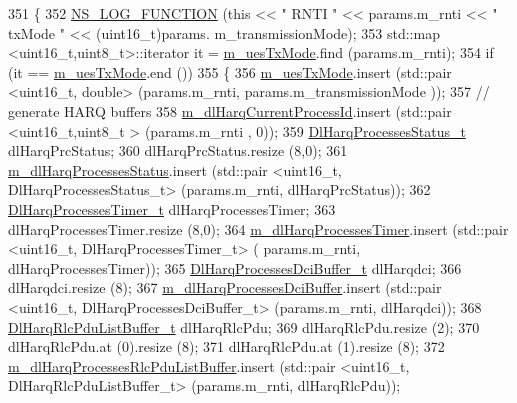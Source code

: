 \begin{DoxyCode}
351 \{
352   \hyperlink{log-macros-disabled_8h_a90b90d5bad1f39cb1b64923ea94c0761}{NS\_LOG\_FUNCTION} (\textcolor{keyword}{this} << \textcolor{stringliteral}{" RNTI "} << params.m\_rnti << \textcolor{stringliteral}{" txMode "} << (uint16\_t)params.
      m\_transmissionMode);
353   std::map <uint16\_t,uint8\_t>::iterator it = \hyperlink{classns3_1_1TdTbfqFfMacScheduler_a81895414769458c1204040d901d7bba7}{m\_uesTxMode}.find (params.m\_rnti);
354   \textcolor{keywordflow}{if} (it == \hyperlink{classns3_1_1TdTbfqFfMacScheduler_a81895414769458c1204040d901d7bba7}{m\_uesTxMode}.end ())
355     \{
356       \hyperlink{classns3_1_1TdTbfqFfMacScheduler_a81895414769458c1204040d901d7bba7}{m\_uesTxMode}.insert (std::pair <uint16\_t, double> (params.m\_rnti, params.m\_transmissionMode
      ));
357       \textcolor{comment}{// generate HARQ buffers}
358       \hyperlink{classns3_1_1TdTbfqFfMacScheduler_ad1c507f0824369e326a2f4594a19f5e9}{m\_dlHarqCurrentProcessId}.insert (std::pair <uint16\_t,uint8\_t > (params.m\_rnti
      , 0));
359       \hyperlink{namespacens3_a457b3571b67ff17d042e9894e90e2ce2}{DlHarqProcessesStatus\_t} dlHarqPrcStatus;
360       dlHarqPrcStatus.resize (8,0);
361       \hyperlink{classns3_1_1TdTbfqFfMacScheduler_a3d25806fc0b4360d668951f3a6b96b8d}{m\_dlHarqProcessesStatus}.insert (std::pair <uint16\_t, DlHarqProcessesStatus\_t> 
      (params.m\_rnti, dlHarqPrcStatus));
362       \hyperlink{namespacens3_a39413ade536de4b1c82d6c0074cc703e}{DlHarqProcessesTimer\_t} dlHarqProcessesTimer;
363       dlHarqProcessesTimer.resize (8,0);
364       \hyperlink{classns3_1_1TdTbfqFfMacScheduler_a772806188cbe19e816a9eab534733ee1}{m\_dlHarqProcessesTimer}.insert (std::pair <uint16\_t, DlHarqProcessesTimer\_t> (
      params.m\_rnti, dlHarqProcessesTimer));
365       \hyperlink{namespacens3_af25599bf8f9f564075c005759c9af18c}{DlHarqProcessesDciBuffer\_t} dlHarqdci;
366       dlHarqdci.resize (8);
367       \hyperlink{classns3_1_1TdTbfqFfMacScheduler_a50d8986111a3dc24130127d3ea391d7e}{m\_dlHarqProcessesDciBuffer}.insert (std::pair <uint16\_t,
       DlHarqProcessesDciBuffer\_t> (params.m\_rnti, dlHarqdci));
368       \hyperlink{namespacens3_a4c0cbd1e72f1c667f8b5879655f13210}{DlHarqRlcPduListBuffer\_t} dlHarqRlcPdu;
369       dlHarqRlcPdu.resize (2);
370       dlHarqRlcPdu.at (0).resize (8);
371       dlHarqRlcPdu.at (1).resize (8);
372       \hyperlink{classns3_1_1TdTbfqFfMacScheduler_a997b6649f2a69dd389d9a4381707b755}{m\_dlHarqProcessesRlcPduListBuffer}.insert (std::pair <uint16\_t,
       DlHarqRlcPduListBuffer\_t> (params.m\_rnti, dlHarqRlcPdu));

\end{DoxyCode}

